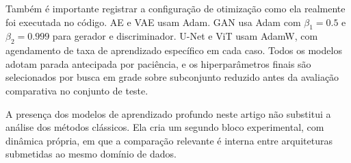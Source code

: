 Também é importante registrar a configuração de otimização como ela realmente foi executada no código.
\gls{AE} e \gls{VAE} usam Adam.
\gls{GAN} usa Adam com $\beta_1{=}0.5$ e $\beta_2{=}0.999$ para gerador e discriminador.
U-Net e \gls{ViT} usam AdamW, com agendamento de taxa de aprendizado específico em cada caso.
Todos os modelos adotam parada antecipada por paciência, e os hiperparâmetros finais são selecionados por busca em grade sobre subconjunto reduzido antes da avaliação comparativa no conjunto de teste.

A presença dos modelos de aprendizado profundo neste artigo não substitui a análise dos métodos clássicos.
Ela cria um segundo bloco experimental, com dinâmica própria, em que a comparação relevante é interna entre arquiteturas submetidas ao mesmo domínio de dados.


